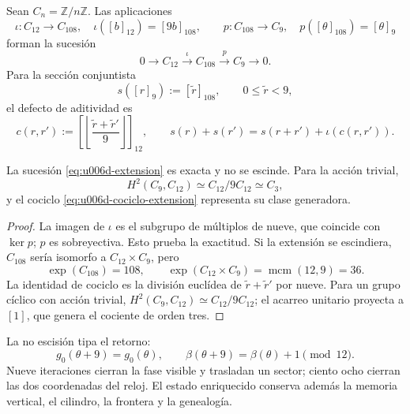 Sean \(C_n=\mathbb Z/n\mathbb Z\). Las aplicaciones
\begin{equation}
 \iota:C_{12}\longrightarrow C_{108},
 \quad \iota([b]_{12})=[9b]_{108},
 \qquad
 p:C_{108}\longrightarrow C_9,
 \quad p([\theta]_{108})=[\theta]_9
 \label{eq:u006d-mapas-extension}
\end{equation}
forman la sucesión
\begin{equation}
 0\longrightarrow C_{12}
 \xrightarrow{\;\iota\;}C_{108}
 \xrightarrow{\;p\;}C_9
 \longrightarrow0.
 \label{eq:u006d-extension}
\end{equation}
Para la sección conjuntista
\[
 s([r]_9):=[\widetilde r]_{108},
 \qquad 0\leq\widetilde r<9,
\]
el defecto de aditividad es
\begin{equation}
 c(r,r'):=
 \left[
 \left\lfloor
 \frac{\widetilde r+\widetilde r'}9
 \right\rfloor
 \right]_{12},
 \qquad
 s(r)+s(r')
 =s(r+r')+\iota(c(r,r')).
 \label{eq:u006d-cociclo-extension}
\end{equation}

\begin{theorem}
\label{thm:u006d-extension-no-escindida}
La sucesión \eqref{eq:u006d-extension} es exacta y no se escinde. Para la
acción trivial,
\begin{equation}
 H^2(C_9,C_{12})
 \simeq C_{12}/9C_{12}
 \simeq C_3,
 \label{eq:u006d-cohomologia-extension}
\end{equation}
y el cociclo \eqref{eq:u006d-cociclo-extension} representa su clase
generadora.
\end{theorem}

\begin{proof}
La imagen de \(\iota\) es el subgrupo de múltiplos de nueve, que coincide
con \(\ker p\); \(p\) es sobreyectiva. Esto prueba la exactitud. Si la
extensión se escindiera, \(C_{108}\) sería isomorfo a
\(C_{12}\times C_9\), pero
\[
 \exp(C_{108})=108,
 \qquad
 \exp(C_{12}\times C_9)=\operatorname{mcm}(12,9)=36.
\]
La identidad de cociclo es la división euclídea de
\(\widetilde r+\widetilde r'\) por nueve. Para un grupo cíclico con acción
trivial,
\(H^2(C_9,C_{12})\simeq C_{12}/9C_{12}\); el acarreo unitario proyecta a
\([1]\), que genera el cociente de orden tres.
\end{proof}

La no escisión tipa el retorno:
\[
 g_0(\theta+9)=g_0(\theta),
 \qquad
 \beta(\theta+9)=\beta(\theta)+1\pmod{12}.
\]
Nueve iteraciones cierran la fase visible y trasladan un sector; ciento
ocho cierran las dos coordenadas del reloj. El estado enriquecido conserva
además la memoria vertical, el cilindro, la frontera y la genealogía.

